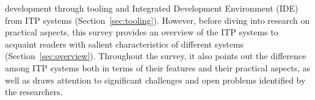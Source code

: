 development through tooling and Integrated Development Environment (IDE) from ITP systems (Section~\ref{sec:tooling}). However, before diving into research on practical aspects, this survey provides an overview of the ITP systems to acquaint readers with salient characteristics of different systems (Section~\ref{sec:overview}). Throughout the survey, it also points out the difference among ITP systems both in terms of their features and their practical aspects, as well as draws attention to significant challenges and open problems identified by the researchers.



